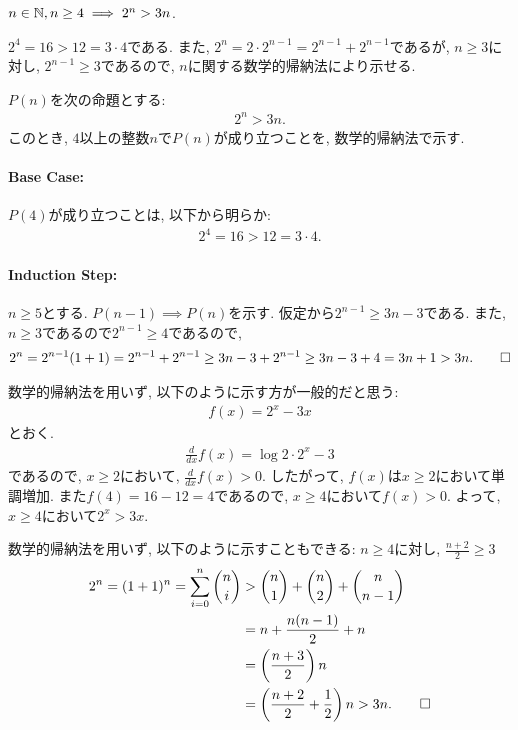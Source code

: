 \begin{prop}
  \label{p:20230814}
  $n\in\mathbb{N}, n\geq 4\implies 2^n > 3n$.
\end{prop}
\begin{proof**}
  $2^4=16>12=3\cdot 4$である.
  また,
  $2^n=2\cdot 2^{n-1}=2^{n-1}+2^{n-1}$であるが,
  $n\geq 3$に対し,
  $2^{n-1} \geq 3$であるので,
  $n$に関する数学的帰納法により示せる.
\end{proof**}
\begin{proof*}
  $P(n)$を次の命題とする:
  \begin{align*}
    2^n > 3n
    .
  \end{align*}
  このとき,
  $4$以上の整数$n$で$P(n)$が成り立つことを,
  数学的帰納法で示す.

  \paragraph{Base Case:}
  $P(4)$が成り立つことは, 以下から明らか:
  \begin{align*}
    2^4=16>12=3\cdot 4.
  \end{align*}
  \paragraph{Induction Step:}
  $n\geq 5$とする.
  $P(n-1)\implies P(n)$を示す.
  仮定から$2^{n-1}\geq 3n-3$である.
  また, $n\geq 3$であるので$2^{n-1}\geq 4$であるので,
  \begin{align*}
    2^n=2^{n-1}(1+1)=2^{n-1}+2^{n-1}\geq 3n-3+2^{n-1}\geq 3n-3+4=3n+1>3n
    .\qedhere
  \end{align*}
\end{proof*}

\begin{rem}
  数学的帰納法を用いず, 以下のように示す方が一般的だと思う:
  \begin{align*}
    f(x)=2^x-3x
  \end{align*}
  とおく.
  \begin{align*}
    \frac{d}{dx}f(x)=\log 2 \cdot 2^x-3
  \end{align*}
  であるので, $x\geq 2$において, $\frac{d}{dx}f(x)> 0$.
  したがって, $f(x)$は$x\geq 2$において単調増加.
  また$f(4)=16-12=4$であるので,
  $x\geq 4$において$f(x) > 0$.
  よって, $x\geq 4$において$2^x>3x$.
\end{rem}

\begin{rem}
  数学的帰納法を用いず, 以下のように示すこともできる:
  $n\geq 4$に対し, $\frac{n+2}{2}\geq 3$
  \begin{align*}
    2^n=(1+1)^n=\sum_{i=0}^n \binom{n}{i}
    &> \binom{n}{1}+\binom{n}{2}+\binom{n}{n-1}\\
    &=n+\frac{n(n-1)}{2}+n\\
    &=\left(\frac{n+3}{2}\right)n\\
    &=\left(\frac{n+2}{2}+\frac{1}{2}\right)n
    > 3n
    .\qedhere
  \end{align*}
\end{rem}


